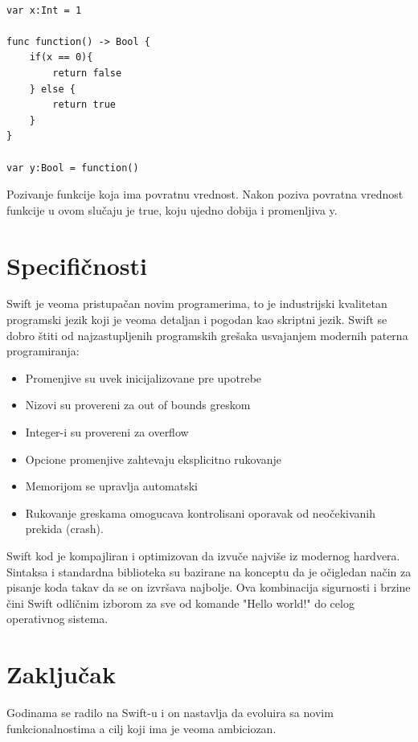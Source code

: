 \documentclass[a4paper]{article}
\begin{document}
\begin{lstlisting}[caption={},frame=single, label=simple]

var x:Int = 1

func function() -> Bool {
	if(x == 0){
		return false
	} else {
		return true
	}
}

var y:Bool = function()

\end{lstlisting}

Pozivanje funkcije koja ima povratnu vrednost. Nakon poziva povratna vrednost funkcije u ovom slučaju je true, koju ujedno dobija i promenljiva y.\\






\section{Specifičnosti}	
\label{sec:sedmiDeo}

Swift je veoma pristupačan novim programerima, to je industrijski kvalitetan programski jezik koji je veoma detaljan i pogodan kao skriptni jezik. Swift se dobro štiti od najzastupljenih programskih grešaka usvajanjem modernih paterna programiranja:
\begin{itemize}
\item Promenjive su uvek inicijalizovane pre upotrebe
\item Nizovi su provereni za out of bounds greskom
\item Integer-i su provereni za overflow
\item Opcione promenjive zahtevaju eksplicitno rukovanje
\item Memorijom se upravlja automatski
\item Rukovanje greskama omogucava kontrolisani oporavak od neočekivanih prekida (crash).
\end{itemize}

Swift kod je kompajliran i optimizovan da izvuče najviše iz modernog hardvera. Sintaksa i standardna biblioteka su bazirane na konceptu da je očigledan način za pisanje koda takav da se on izvršava najbolje. Ova kombinacija sigurnosti i brzine čini Swift odličnim izborom za sve od komande "Hello world!" do celog operativnog sistema.

\section{Zaključak}
\label{sec:zakljucak}
Godinama se radilo na Swift-u i on nastavlja da evoluira  sa novim funkcionalnostima a cilj koji ima je veoma ambiciozan.

\appendix
 


\appendix
\end{document}
